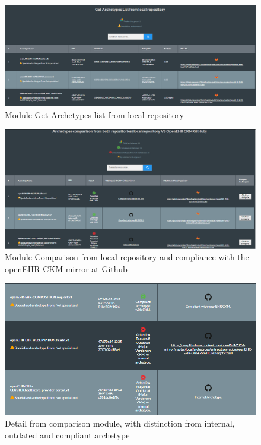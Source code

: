 \documentclass[mim_thesis.tex]{subfiles}
\begin{document}
\begin{figure}[H]
	\centering
    \includegraphics[width=1\textwidth]{img/get_arch_list.PNG}
	\caption{Module Get Archetypes list from local repository }
	\label{fig:get_arch_list}
\end{figure}

\begin{figure}[H]
	\centering
    \includegraphics[width=1\textwidth]{img/arch_comparison.PNG}
	\caption{Module Comparison from local repository and compliance with the openEHR CKM mirror at Github}
	\label{fig:arch_comparison}
\end{figure}

\begin{figure}[H]
	\centering
    \includegraphics[width=1\textwidth]{img/arch_comparison_2.PNG}
	\caption{Detail from comparison module, with distinction from internal, outdated and compliant archetype}
	\label{fig:arch_comparison_2}
\end{figure}
\end{document}
